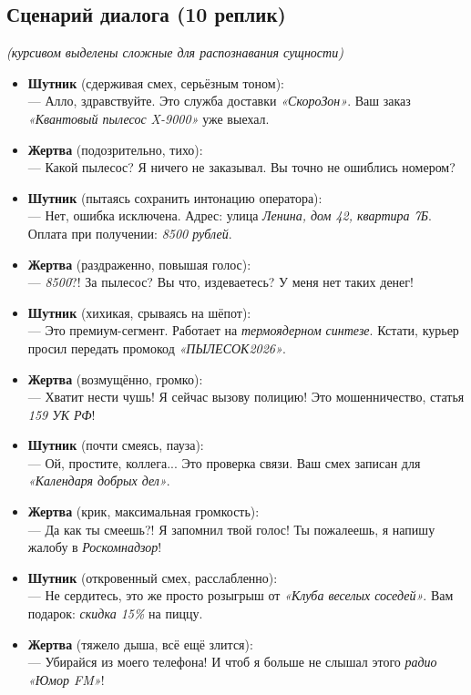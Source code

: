 \documentclass[oneside,a4paper,14pt]{extarticle}
\begin{document}
	\subsection{Сценарий диалога (10 реплик)}
	\noindent\textit{(курсивом выделены сложные для распознавания сущности)}
	\begin{itemize}
		\item \textbf{Шутник} (сдерживая смех, серьёзным тоном): \\
		--- Алло, здравствуйте. Это служба доставки \textit{«СкороЗон»}. Ваш заказ \textit{«Квантовый пылесос X-9000»} уже выехал.
		\item \textbf{Жертва} (подозрительно, тихо): \\
		--- Какой пылесос? Я ничего не заказывал. Вы точно не ошиблись номером?
		\item \textbf{Шутник} (пытаясь сохранить интонацию оператора): \\
		--- Нет, ошибка исключена. Адрес: улица \textit{Ленина, дом 42, квартира 7Б}. Оплата при получении: \textit{8500 рублей}.
		\item \textbf{Жертва} (раздраженно, повышая голос): \\
		--- \textit{8500}?! За пылесос? Вы что, издеваетесь? У меня нет таких денег!
		\item \textbf{Шутник} (хихикая, срываясь на шёпот): \\
		--- Это премиум-сегмент. Работает на \textit{термоядерном синтезе}. Кстати, курьер просил передать промокод \textit{«ПЫЛЕСОК2026»}.
		\item \textbf{Жертва} (возмущённо, громко): \\
		--- Хватит нести чушь! Я сейчас вызову полицию! Это мошенничество, статья \textit{159 УК РФ}!
		\item \textbf{Шутник} (почти смеясь, пауза): \\
		--- Ой, простите, коллега... Это проверка связи. Ваш смех записан для \textit{«Календаря добрых дел»}.
		\item \textbf{Жертва} (крик, максимальная громкость): \\
		--- Да как ты смеешь?! Я запомнил твой голос! Ты пожалеешь, я напишу жалобу в \textit{Роскомнадзор}!
		\item \textbf{Шутник} (откровенный смех, расслабленно): \\
		--- Не сердитесь, это же просто розыгрыш от \textit{«Клуба веселых соседей»}. Вам подарок: \textit{скидка 15\%} на пиццу.
		\item \textbf{Жертва} (тяжело дыша, всё ещё злится): \\
		--- Убирайся из моего телефона! И чтоб я больше не слышал этого \textit{радио «Юмор FM»}!
	\end{itemize}
	
\end{document}
